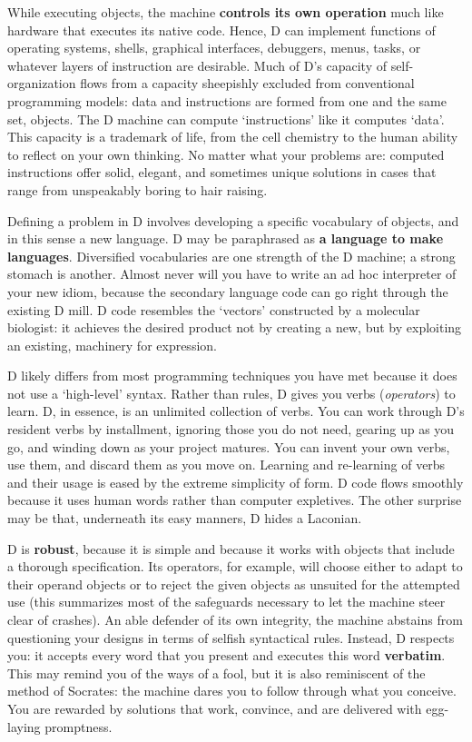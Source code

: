 While executing objects,  the machine \textbf{controls its own operation} much like  hardware that executes its native code.  Hence,  D can implement functions of operating systems, shells, graphical interfaces, debuggers, menus, tasks, or  whatever layers of instruction are desirable. Much of D's capacity of self-organization flows from a capacity sheepishly excluded from conventional programming models: data  and instructions are formed from one and the same set, objects. The D  machine can compute `instructions' like it  computes `data'.  This capacity is  a trademark  of life, from the cell chemistry to the human ability to reflect on your own thinking. No matter what your  problems  are: computed  instructions  offer  solid,   elegant,   and  sometimes  unique solutions  in cases that range from unspeakably boring to hair raising.

Defining  a  problem in D involves developing a specific  vocabulary  of objects,  and  in this sense a new language.  D may be paraphrased  as \textbf{a language to make languages}.  Diversified vocabularies are one strength of the D machine; a strong stomach is another. Almost never will you have to write  an  ad hoc interpreter of your new idiom,  because  the  secondary language code can go right through the existing D  mill. D code resembles the `vectors' constructed by a molecular biologist: it achieves the desired product not by creating a new,  but by exploiting an existing,  machinery for expression.

D likely differs from most programming techniques you have met because it does not use a `high-level' syntax. Rather than rules, D gives you verbs (\emph{operators}) to learn. D, in essence, is an unlimited collection of verbs. You  can work through  D's resident verbs by  installment, ignoring those you do not need,  gearing up as you go, and winding down as your project matures. You can invent your own verbs, use them, and discard them as you move on. Learning and re-learning of verbs and their usage is eased by the extreme simplicity of form. D code flows smoothly because it uses human words rather than computer expletives. The other surprise may be that, underneath its easy manners, D hides a Laconian.  

D is \textbf{robust}, because it is simple and because it works with objects that include a thorough specification.  Its operators,  for example,  will  choose either  to  adapt to their operand objects or to reject the given objects  as unsuited  for  the  attempted  use  (this  summarizes  most  of   the safeguards necessary to let the machine steer clear of crashes). An  able defender of its own integrity, the machine abstains from questioning your designs in terms of selfish syntactical rules. Instead, D respects you:  it  accepts  every  word that you present and  executes  this  word \textbf{verbatim}.  This  may  remind you of the ways of a fool,  but it  is  also reminiscent  of the method of Socrates:  the machine dares you to  follow through  what  you conceive.  You are rewarded by  solutions  that  work, convince, and are delivered with egg-laying promptness.

